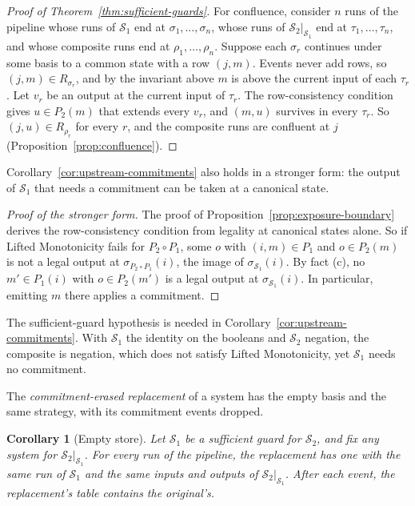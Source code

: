 \documentclass[sigconf]{cidr-2027}
\newtheorem{corollary}{Corollary}
\theoremstyle{remark}
\newcommand{\commitment}{commitment\xspace}
\newcommand{\outrel}{extends\xspace}          %
\newcommand{\Spec}{\mathcal{S}}
\begin{document}
\begin{proof}[Proof of Theorem~\ref{thm:sufficient-guards}]
For confluence, consider $n$ runs of the pipeline whose runs of $\Spec_1$ end
at $\sigma_1,\ldots,\sigma_n$, whose runs of $\Spec_2|_{\Spec_1}$ end at
$\tau_1,\ldots,\tau_n$, and whose composite runs end at
$\rho_1,\ldots,\rho_n$. Suppose each $\sigma_r$ continues under some basis to
a common state with a row $(j,m)$. Events never add rows, so $(j,m)\in
R_{\sigma_r}$, and by the invariant above $m$ is above the current input of
each $\tau_r$. Let $v_r$ be an output at the current input of $\tau_r$. The
row-consistency condition gives $u\in P_2(m)$ that \outrel every $v_r$, and
$(m,u)$ survives in every $\tau_r$. So $(j,u)\in R_{\rho_r}$ for every $r$,
and the composite runs are confluent at $j$
(Proposition~\ref{prop:confluence}).
\end{proof}

Corollary~\ref{cor:upstream-commitments} also holds in a stronger form: the
output of $\Spec_1$ that needs a \commitment can be taken at a canonical state.

\begin{proof}[Proof of the stronger form]
The proof of Proposition~\ref{prop:exposure-boundary} derives the
row-consistency condition from legality at canonical states alone. So if
Lifted Monotonicity fails for $P_2\circ P_1$, some $o$ with $(i,m)\in P_1$ and
$o\in P_2(m)$ is not a legal output at $\sigma_{P_2\circ P_1}(i)$, the image
of $\sigma_{\Spec_1}(i)$. By fact (c), no $m'\in P_1(i)$ with $o\in P_2(m')$
is a legal output at $\sigma_{\Spec_1}(i)$. In particular, emitting $m$
there applies a \commitment.
\end{proof}

The sufficient-guard hypothesis is needed in Corollary~\ref{cor:upstream-commitments}. With $\Spec_1$ the identity on the booleans and
$\Spec_2$ negation, the composite is negation, which does not satisfy Lifted
Monotonicity, yet $\Spec_1$ needs no \commitment.

The \emph{\commitment-erased replacement} of a system has the empty basis and
the same strategy, with its \commitment events dropped.

\begin{corollary}[Empty store]
\label{cor:empty-store}
\textcolor{reviewed}{Let $\Spec_1$ be a sufficient guard for $\Spec_2$, and fix any system for $\Spec_2|_{\Spec_1}$.} For every run
of the pipeline, the replacement has one with the same run of $\Spec_1$ and
the same inputs and outputs of $\Spec_2|_{\Spec_1}$. After each event, the
replacement's table contains the original's.
\end{corollary}
\end{document}
